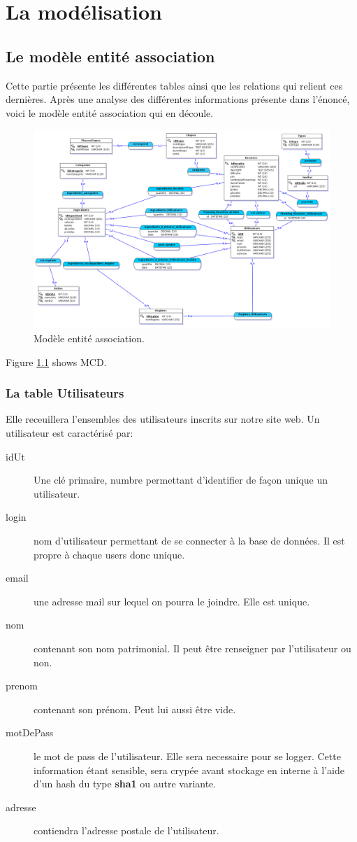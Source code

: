 \chapter{La modélisation}

\section{Le modèle entité association}
Cette partie présente les différentes tables ainsi que les relations
qui relient ces dernières. Après une analyse des différentes informations présente dans l'énoncé, voici le modèle entité association qui en découle.

\begin{figure}
    \includegraphics[scale=0.3]{images/RecetteDeCuisineJMerise.png}
    \caption{Modèle entité association.}
    \label{fig:modele E/A}
\end{figure}
Figure \ref{fig:modele E/A} shows MCD.

\subsection{La table Utilisateurs}
Elle receuillera l'ensembles des utilisateurs inscrits sur notre site web.
Un utilisateur est caractérisé par:
\begin{description}
    \item[idUt] Une clé primaire, numbre permettant d'identifier de façon unique un utilisateur.
    \item[login] nom d'utilisateur permettant de se connecter à la base de données. Il est propre à chaque users donc unique.
    \item[email] une adresse mail sur lequel on pourra le joindre. Elle est unique.
    \item[nom] contenant son nom patrimonial. Il peut être renseigner par l'utilisateur ou non.
    \item[prenom] contenant son prénom. Peut lui aussi être vide.
    \item[motDePass] le mot de pass de l'utilisateur. Elle sera necessaire pour se logger. Cette information étant sensible, sera crypée avant stockage en interne à l'aide d'un hash du type \textbf{sha1} ou autre variante.
    \item[adresse] contiendra l'adresse postale de l'utilisateur.
\end{description}

